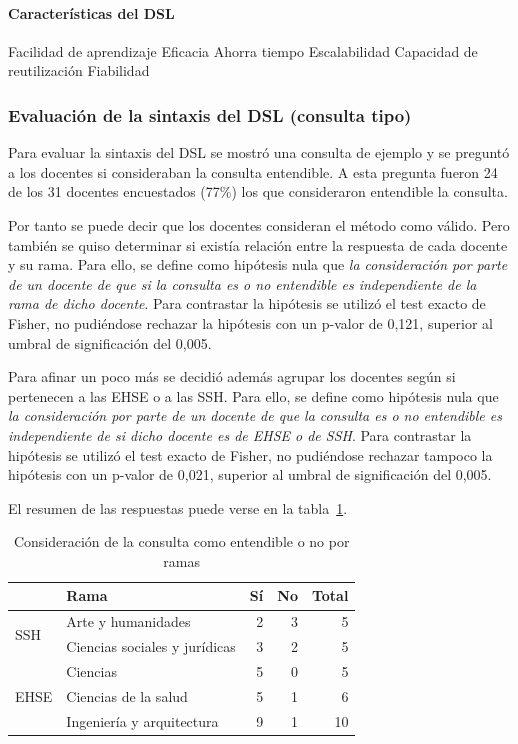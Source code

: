 \paragraph{Características del DSL}

Facilidad de aprendizaje	Eficacia	Ahorra tiempo	Escalabilidad	Capacidad de reutilización	Fiabilidad

\subsubsection{Evaluación de la sintaxis del DSL (consulta tipo)}

Para evaluar la sintaxis del DSL se mostró una consulta de ejemplo y se preguntó a los docentes si consideraban la consulta entendible. A esta pregunta fueron 24 de los 31 docentes encuestados (77\%) los que consideraron entendible la consulta.

Por tanto se puede decir que los docentes consideran el método como válido. Pero también se quiso determinar si existía relación entre la respuesta de cada docente y su rama. Para ello, se define como hipótesis nula que \emph{la consideración por parte de un docente de que si la consulta es o no entendible es independiente de la rama de dicho docente}. Para contrastar la hipótesis se utilizó el test exacto de Fisher, no pudiéndose rechazar la hipótesis con un p-valor de 0,121, superior al umbral de significación del 0,005.

Para afinar un poco más se decidió además agrupar los docentes según si pertenecen a las EHSE o a  las SSH. Para ello, se define como hipótesis nula que \emph{la consideración por parte de un docente de que la consulta es o no entendible es independiente de si  dicho docente es de EHSE o de SSH}. Para contrastar la hipótesis se utilizó el test exacto de Fisher, no pudiéndose rechazar tampoco la hipótesis con un p-valor de 0,021, superior al umbral de significación del 0,005.

El resumen de las respuestas puede verse en la tabla~\ref{tab:cap:encuesta:consulta:rama}.

\begin{table}
  \begin{center}
  \begin{tabular}{| l | l | r | r | r |}
    \hline
    & Rama & Sí & No & Total \\
    \hline
    \hline
    \multirow{2}{2.5cm}{SSH} & Arte y humanidades & 2 & 3 & 5  \\
    \cline{2-5}
    & Ciencias sociales y jurídicas & 3 & 2 & 5  \\
    \hline
    \multirow{3}{2.5cm}{EHSE} & Ciencias & 5 & 0 & 5  \\
    \cline{2-5}
    & Ciencias de la salud & 5 & 1 & 6  \\
    \cline{2-5}
    & Ingeniería y arquitectura & 9 & 1 & 10 \\
    \hline
  \end{tabular}
\end{center}
\caption{Consideración de la consulta como entendible o no por ramas}
\label{tab:cap:encuesta:consulta:rama}
\end{table}

